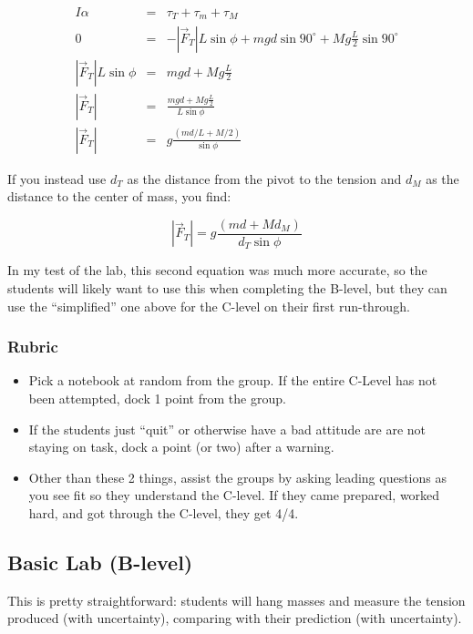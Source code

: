 \documentclass[fleqn,letterpaper]{article}
\begin{document}
\begin{eqnarray}
 I \alpha & = & \tau_T + \tau_m + \tau_M \\
 0 & = & -|\vec{F}_T| L \sin \phi + m g d \sin 90^{\circ} + M g \frac{L}{2} \sin 90^{\circ} \\
 |\vec{F}_T| L \sin \phi & = & m g d  + M g \frac{L}{2} \\
 |\vec{F}_T| & = & \frac{m g d  + M g \frac{L}{2}}{L \sin \phi} \\
 |\vec{F}_T| & = & g\frac{(m d/L  + M/2)}{\sin \phi}
\end{eqnarray}

If you instead use $d_T$ as the distance from the pivot to the tension and $d_M$ as the distance to the center of mass, you find:

\begin{equation}
 |\vec{F}_T| =  g\frac{(m d  + M d_M)}{d_T \sin \phi}
\end{equation}

In my test of the lab, this second equation was much more accurate, so the students will likely want to use this when completing the B-level, but they can use the ``simplified'' one above for the C-level on their first run-through.

\subsubsection*{Rubric}

\begin{itemize}
 \item{Pick a notebook at random from the group.  If the entire C-Level has not been attempted, dock 1 point from the group.}
 \item{If the students just ``quit'' or otherwise have a bad attitude are are not staying on task, dock a point (or two) after a warning.}
 \item{Other than these 2 things, assist the groups by asking leading questions as you see fit so they understand the C-level.  If they came prepared, worked hard, and got through the C-level, they get 4/4.}
\end{itemize}


\subsection*{Basic Lab (B-level)}

This is pretty straightforward: students will hang masses and measure the tension produced (with uncertainty), comparing with their prediction (with uncertainty).
\end{document}
